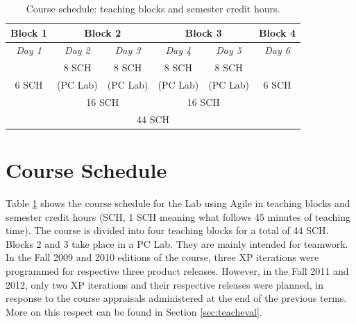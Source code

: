 \documentclass[conference]{IEEEtran}
\begin{document}
\begin{table}[!t]
  \renewcommand{\arraystretch}{1.3}
  \setlength{\tabcolsep}{0.6em}
  \caption{Course schedule: teaching blocks and semester credit hours.}
  \label{tab:SCHblocks}
  \centering
  \begin{tabular}{|c|cc|cc|c|}
    \hline
    \bfseries Block 1 & \multicolumn{2}{|c|}{\bfseries Block 2} & \multicolumn{2}{|c|}{\bfseries Block 3} & \bfseries Block 4\\
    \hline
    \textit{Day 1} & \multicolumn{1}{|c|}{\textit{Day 2}} & \textit{Day 3} & \multicolumn{1}{|c|}{\textit{Day 4}} & \textit{Day 5} & \textit{Day 6}\\
    \hline
    \hline
    & \multicolumn{1}{|c|}{8 SCH} & \multicolumn{1}{|c|}{8 SCH} & \multicolumn{1}{|c|}{8 SCH} & \multicolumn{1}{|c|}{8 SCH} & \\
    6 SCH & \multicolumn{1}{|c|}{(PC Lab)} & \multicolumn{1}{|c|}{(PC Lab)} & \multicolumn{1}{|c|}{(PC Lab)} & \multicolumn{1}{|c|}{(PC Lab)} & 6 SCH \\
    \cline{2-4}
    \cline{4-5}
    & \multicolumn{2}{|c|}{16 SCH} & \multicolumn{2}{|c|}{16 SCH} & \\
    \hline
    \hline
    \multicolumn{6}{|c|}{44 SCH} \\
    \hline
\end{tabular}
\end{table} 




\section{Course Schedule}
\label{sec:courseschedule}

Table \ref{tab:SCHblocks} shows the course schedule for the Lab using Agile in teaching blocks and semester credit hours (SCH, 1 SCH meaning what follows 45 minutes of teaching time). The course is divided into four teaching blocks for a total of 44 SCH. Blocks 2 and 3 take place in a PC Lab. They are mainly intended for teamwork. In the Fall 2009 and 2010 editions of the course, three XP iterations were programmed for respective three product releases. However, in the Fall 2011 and 2012, only two XP iterations and their respective releases were planned, in response to the course appraisals administered at the end of the previous terms. More on this respect can be found in Section \ref{sec:teacheval}.
\end{document}
